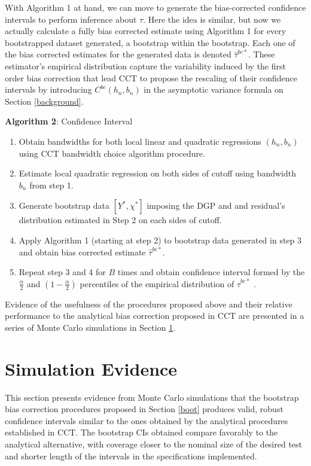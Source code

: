 \documentclass[12pt,fleqn]{article}
\begin{document}
With Algorithm 1 at hand, we can move to generate the bias-corrected confidence intervals to perform inference about $\tau$. Here the idea is similar, but now we actually calculate a fully bias corrected estimate using Algorithm 1 for every bootstrapped dataset generated, a bootstrap within the bootstrap. Each one of the bias corrected estimates for the generated data is denoted $\hat{\tau}^{bc*}$. These estimator's empirical distribution capture the variability induced by the first order bias correction that lead CCT to propose the rescaling of their confidence intervals by introducing $C^{bc}(h_{n},b_{n})$ in the asymptotic variance formula on Section \ref{background}.

\textbf{Algorithm 2}: Confidence Interval
 \begin{enumerate}
	\item Obtain bandwidths for both local linear and quadratic regressions $(h_{n}, b_{n})$ using CCT bandwidth choice algorithm procedure.
	\item Estimate local quadratic regression on both sides of cutoff using bandwidth $b_{n}$ from step 1.
	\item Generate bootstrap data $[Y^{*},\chi^{*}]$ imposing the DGP and and residual's distribution estimated in Step 2 on each sides of cutoff.
	\item Apply Algorithm 1 (starting at step 2) to bootstrap data generated in step 3 and obtain bias corrected estimate $\hat{\tau}^{bc*}$.
	\item Repeat step 3 and 4 for $B$ times and obtain confidence interval formed by the $\frac{\alpha}{2}$ and $\left(1-\frac{\alpha}{2}\right)$ percentiles of the empirical distribution of $\hat{\tau}^{bc*}$ .
 \end{enumerate}

Evidence of the usefulness of the procedures proposed above and their relative performance to the analytical bias correction proposed in CCT are presented in a series of Monte Carlo simulations in Section \ref{sim}.

\section{Simulation Evidence}\label{sim}

This section presents evidence from Monte Carlo simulations that the bootstrap bias correction procedures proposed in Section \ref{boot} produces valid, robust confidence intervals similar to the ones obtained by the analytical procedures established in CCT. The bootstrap CIs obtained compare favorably to the analytical alternative, with coverage closer to the nominal size of the desired test and shorter length of the intervals in the specifications implemented.
\end{document}
